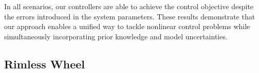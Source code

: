 In all scenarios, our controllers are able to achieve the control objective
despite the errors introduced in the system parameters.
%
%
These results demonstrate that our approach enables a unified way to tackle
nonlinear control problems while simultaneously incorporating prior knowledge
and model uncertainties.
%
  
\subsection{Rimless Wheel}

